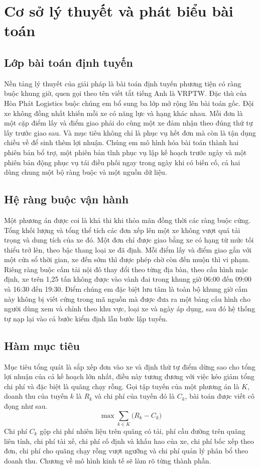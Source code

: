 \documentclass[12pt,a4paper,oneside]{report}
\begin{document}
\chapter{Cơ sở lý thuyết và phát biểu bài toán}

\section{Lớp bài toán định tuyến}
Nền tảng lý thuyết của giải pháp là bài toán định tuyến phương tiện có ràng buộc khung giờ, quen gọi theo tên viết tắt tiếng Anh là VRPTW. Đặc thù của Hòa Phát Logistics buộc chúng em bổ sung ba lớp mở rộng lên bài toán gốc. Đội xe không đồng nhất khiến mỗi xe có năng lực và hạng khác nhau. Mỗi đơn là một cặp điểm lấy và điểm giao phải do cùng một xe đảm nhận theo đúng thứ tự lấy trước giao sau. Và mục tiêu không chỉ là phục vụ hết đơn mà còn là tận dụng chiều về để sinh thêm lợi nhuận. Chúng em mô hình hóa bài toán thành hai phiên bản bổ trợ, một phiên bản tĩnh phục vụ lập kế hoạch trước ngày và một phiên bản động phục vụ tái điều phối ngay trong ngày khi có biến cố, cả hai dùng chung một bộ ràng buộc và một nguồn dữ liệu.

\section{Hệ ràng buộc vận hành}
Một phương án được coi là khả thi khi thỏa mãn đồng thời các ràng buộc cứng. Tổng khối lượng và tổng thể tích các đơn xếp lên một xe không vượt quá tải trọng và dung tích của xe đó. Một đơn chỉ được giao bằng xe có hạng từ mức tối thiểu trở lên, theo bậc thang loại xe đã định. Mỗi điểm lấy và điểm giao gắn với một cửa sổ thời gian, xe đến sớm thì được phép chờ còn đến muộn thì vi phạm. Riêng ràng buộc cấm tải nội đô thay đổi theo từng địa bàn, theo cấu hình mặc định, xe trên 1,25 tấn không được vào vành đai trong khung giờ 06:00 đến 09:00 và 16:30 đến 19:30. Điểm chúng em đặc biệt lưu tâm là toàn bộ khung giờ cấm này không bị viết cứng trong mã nguồn mà được đưa ra một bảng cấu hình cho người dùng xem và chỉnh theo khu vực, loại xe và ngày áp dụng, sau đó hệ thống tự nạp lại vào cả bước kiểm định lẫn bước lập tuyến.

\section{Hàm mục tiêu}
Mục tiêu tổng quát là sắp xếp đơn vào xe và định thứ tự điểm dừng sao cho tổng lợi nhuận của cả kế hoạch lớn nhất, điều này tương đương với việc kéo giảm tổng chi phí và đặc biệt là quãng chạy rỗng. Gọi tập tuyến của một phương án là $K$, doanh thu của tuyến $k$ là $R_k$ và chi phí của tuyến đó là $C_k$, bài toán được viết cô đọng như sau.
\begin{equation}
\max \sum_{k \in K} \bigl( R_k - C_k \bigr)
\end{equation}
Chi phí $C_k$ gộp chi phí nhiên liệu trên quãng có tải, phí cầu đường trên quãng liên tỉnh, chi phí tài xế, chi phí cố định và khấu hao của xe, chi phí bốc xếp theo đơn, chi phí cho quãng chạy rỗng vượt ngưỡng và chi phí quản lý phân bổ theo doanh thu. Chương về mô hình kinh tế sẽ làm rõ từng thành phần.
\end{document}
